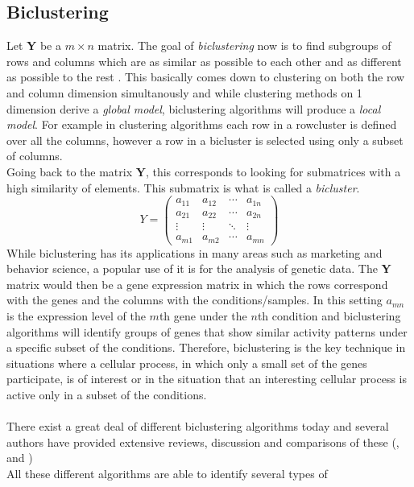 \documentclass[a4paper]{article}\usepackage[]{graphicx}\usepackage[]{color}
\begin{document}
\subsection{Biclustering}
Let {\bf Y} be a $m \times n$ matrix. The goal of {\it biclustering} now is to
find subgroups of rows and columns which are as similar as possible to each
other and as different as possible to the rest \citep{Kaiser2008}. This
basically comes down to clustering on both the row and column dimension
simultanously and while clustering methods on 1 dimension derive a {\it global
model}, biclustering algorithms will produce a {\it local model}.
For example in clustering algorithms each row in a rowcluster is defined over
all the columns, however a row in a bicluster is selected using only a subset of
columns.\\
Going back to the matrix {\bf Y}, this corresponds to looking for submatrices
with a high similarity of elements. This submatrix is what is called a {\it
bicluster}.
$$
Y = 
\begin{pmatrix}
  a_{11} & a_{12} & \cdots & a_{1n} \\
  a_{21} & a_{22} & \cdots & a_{2n} \\
  \vdots  & \vdots  & \ddots & \vdots  \\
  a_{m1} & a_{m2} & \cdots & a_{mn}
\end{pmatrix}
$$
\noindent While biclustering has its applications in many areas such as
marketing and behavior science, a popular use of it is for the analysis of
genetic data. The {\bf Y} matrix would then be a gene expression matrix in which the
rows correspond with the genes and the columns with the conditions/samples. In
this setting $a_{mn}$ is the expression level of the $m$th gene under the $n$th
condition and biclustering algorithms will identify groups of genes that show
similar activity patterns under a specific subset of the conditions. Therefore,
biclustering is the key technique in situations where a cellular process, in
which only a small set of the genes participate, is of interest or in the
situation that an interesting cellular process is active only in a subset of the
conditions. 
\\ \\
There exist a great deal of different biclustering algorithms today and several
authors have provided extensive reviews, discussion and comparisons of these
(\citealp{Madeira2004}, \citealp{Tanay2004} and \citealp{Prelic2006})\\
All these different algorithms are able to identify several types of
\end{document}
